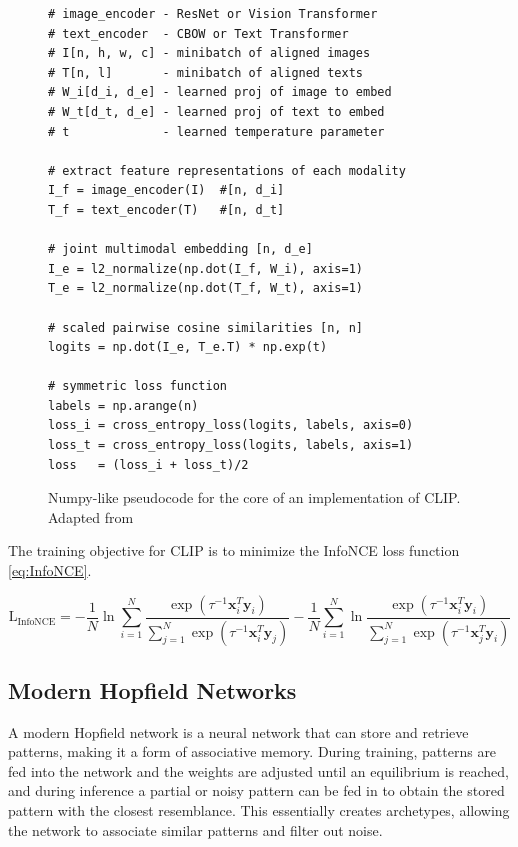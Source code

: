 \documentclass{scrarticle}
\begin{document}
\begin{figure}[H]  %
  \begin{lstlisting}[style=Py2]
# image_encoder - ResNet or Vision Transformer
# text_encoder  - CBOW or Text Transformer
# I[n, h, w, c] - minibatch of aligned images
# T[n, l]       - minibatch of aligned texts
# W_i[d_i, d_e] - learned proj of image to embed
# W_t[d_t, d_e] - learned proj of text to embed
# t             - learned temperature parameter

# extract feature representations of each modality
I_f = image_encoder(I)  #[n, d_i]
T_f = text_encoder(T)   #[n, d_t]

# joint multimodal embedding [n, d_e]
I_e = l2_normalize(np.dot(I_f, W_i), axis=1)
T_e = l2_normalize(np.dot(T_f, W_t), axis=1)

# scaled pairwise cosine similarities [n, n]
logits = np.dot(I_e, T_e.T) * np.exp(t)

# symmetric loss function
labels = np.arange(n)
loss_i = cross_entropy_loss(logits, labels, axis=0)
loss_t = cross_entropy_loss(logits, labels, axis=1)
loss   = (loss_i + loss_t)/2
  \end{lstlisting}
  \caption{Numpy-like pseudocode for the core of an implementation of CLIP. Adapted from \citet{clip}}
  \label{fig:pseudo_clip}
\end{figure}

The training objective for CLIP is to minimize the InfoNCE loss function \eqref{eq:InfoNCE}.

\begin{equation}\label{eq:InfoNCE}
  \operatorname{L_{InfoNCE}} =
  - \frac{1}{N} \ln \sum_{i=1}^{N} \frac{\exp(\tau^{-1} \mathbf{x}_i^T \mathbf{y}_i)}{\sum_{j=1}^{N} \exp(\tau^{-1} \mathbf{x}_i^T \mathbf{y}_j)}
  - \frac{1}{N} \sum_{i=1}^{N} \ln \frac{\exp(\tau^{-1} \mathbf{x}_i^T \mathbf{y}_i)}{\sum_{j=1}^{N} \exp(\tau^{-1} \mathbf{x}_j^T \mathbf{y}_i)}
\end{equation}

\subsection{Modern Hopfield Networks}

A modern Hopfield network is a neural network that can store and retrieve patterns, making it a form of associative memory. During training, patterns are fed into the network and the weights are adjusted until an equilibrium is reached, and during inference a partial or noisy pattern can be fed in to obtain the stored pattern with the closest resemblance. This essentially creates archetypes, allowing the network to associate similar patterns and filter out noise.
\end{document}
